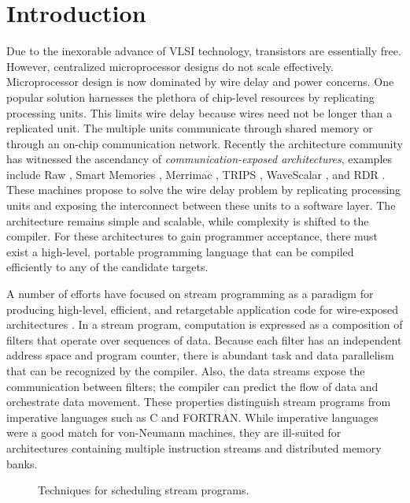 \section{Introduction}

Due to the inexorable advance of VLSI technology, transistors are
essentially free.  However, centralized microprocessor designs do not
scale effectively.  Microprocessor design is now dominated by wire
delay and power concerns.  One popular solution harnesses the plethora of
chip-level resources by replicating processing units.  This limits
wire delay because wires need not be longer than a replicated unit.
The multiple units communicate through shared memory or through an
on-chip communication network.  Recently the architecture community
has witnessed the ascendancy of {\it communication-exposed architectures},
examples include Raw \cite{raw}, Smart Memories
\cite{smartmemories}, Merrimac \cite{merrimac-sc03}, TRIPS
\cite{trips}, WaveScalar \cite{wavescalar}, and RDR \cite{rdr}.  These
machines propose to solve the wire delay problem by replicating
processing units and exposing the interconnect between these units to
a software layer.  The architecture remains simple and scalable, while
complexity is shifted to the compiler. For these architectures to gain
programmer acceptance, there must exist a high-level, portable
programming language that can be compiled efficiently to any of the
candidate targets.

A number of efforts have focused on stream programming as a paradigm
for producing high-level, efficient, and retargetable application code
for wire-exposed architectures
\cite{streamit-asplos,imagine-ieee,merrimac-sc03,trips-isca03}.  In a
stream program, computation is expressed as a composition of filters
that operate over sequences of data.  Because each filter has an
independent address space and program counter, there is abundant task
and data parallelism that can be recognized by the compiler.  Also,
the data streams expose the communication between filters; the
compiler can predict the flow of data and orchestrate data movement.
These properties distinguish stream programs from imperative languages
such as C and FORTRAN.  While imperative languages were a good match
for von-Neumann machines, they are ill-suited for architectures
containing multiple instruction streams and distributed memory banks.

\begin{figure*}[th]
  \centering
  \vspace{-18pt}
  \vspace{-12pt}
  \caption{Techniques for scheduling stream programs. \protect\label{fig:spacevstime}}
  \vspace{-6pt}
\end{figure*}

